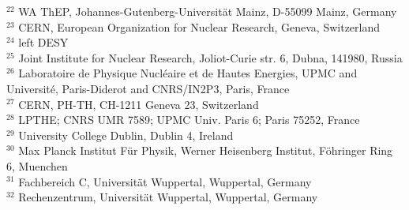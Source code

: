 { $ ^{22}$ WA ThEP, Johannes-Gutenberg-Universit\" at Mainz, D-55099 Mainz, Germany \\
 $ ^{23}$ CERN, European Organization for Nuclear Research, Geneva, Switzerland \\
 $ ^{24}$ left DESY \\
 $ ^{25}$ Joint Institute for Nuclear Research, Joliot-Curie str. 6, Dubna, 141980, Russia \\ 
 $ ^{26}$ Laboratoire de Physique Nucl\' eaire et de Hautes Energies, UPMC and Universit\'e, Paris-Diderot and CNRS/IN2P3, Paris, France \\
 $ ^{27}$ CERN, PH-TH, CH-1211 Geneva 23, Switzerland \\
 $ ^{28}$ LPTHE; CNRS UMR 7589; UPMC Univ. Paris 6; Paris 75252, France \\
 $ ^{29}$ University College Dublin, Dublin 4, Ireland \\
 $ ^{30}$ Max Planck Institut F\"ur Physik, Werner Heisenberg Institut, F\"ohringer Ring 6, Muenchen \\
 $ ^{31}$ Fachbereich C, Universit\"at Wuppertal, Wuppertal, Germany \\
 $ ^{32}$ Rechenzentrum, Universit\"at Wuppertal, Wuppertal, Germany \\
}
%
